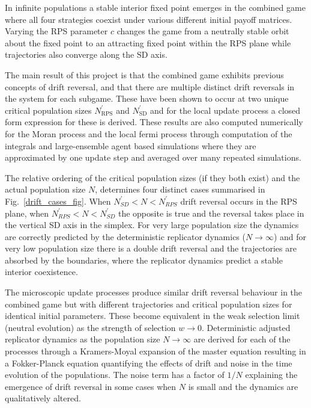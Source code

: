 \documentclass[%
 reprint,
 amsmath,amssymb,
 aps,
]{revtex4-2}
\begin{document}
In infinite populations a stable interior fixed point emerges in the combined game where all 
four strategies coexist under various different initial payoff matrices. Varying the 
RPS parameter $c$ changes the game from a neutrally stable orbit about the fixed point to an 
attracting fixed point within the RPS plane while trajectories also converge along the SD axis.

The main result of this project is that the combined game exhibits previous concepts of drift reversal, 
and that there are multiple distinct drift reversals in the system for each subgame. These have been shown 
to occur at two unique critical population sizes $N^\prime_{\mathrm{RPS}}$ and 
$N^\prime_{\mathrm{SD}}$ and for the local update process a closed form expression for these is derived.
These results are also computed numerically for the Moran process and the local fermi process through 
computation of the integrals and large-ensemble agent based simulations where they are approximated by one update step 
and averaged over many repeated simulations.

The relative ordering of the critical population sizes (if they both exist) and 
the actual population size $N$, determines four distinct
cases summarised in Fig.~\ref{drift_cases_fig}. When $N^\prime_{SD} < N < N^\prime_{RPS}$ drift reversal occurs 
in the RPS plane, when $N^\prime_{RPS} < N < N^\prime_{SD}$ the opposite is true and the reversal takes place in the 
vertical SD axis in the simplex. For very large population size the dynamics are correctly predicted by the 
deterministic replicator dynamics ($N \rightarrow \infty$) and for very low population size
there is a double drift reversal and the trajectories are absorbed by the boundaries, where the replicator 
dynamics predict a stable interior coexistence.

The microscopic update processes produce similar drift reversal behaviour in the combined game but with 
different trajectories and critical population sizes for identical initial parameters.
These become equivalent in the weak selection limit (neutral evolution) 
as the strength of selection $w \rightarrow 0$. Deterministic adjusted replicator dynamics as 
the population size $N \rightarrow \infty$ are derived for each of the processes through a 
Kramers-Moyal expansion of the master equation resulting in a Fokker-Planck equation quantifying the effects
of drift and noise in the time evolution of the populations. The noise term has a factor of $1/N$ 
explaining the emergence of drift reversal in some cases when $N$ is small and the dynamics are 
qualitatively altered.
\end{document}
